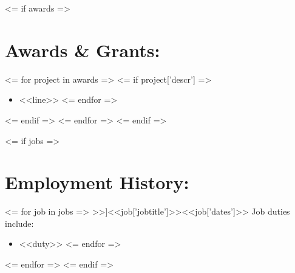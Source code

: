 \documentclass{resume}
\begin{document}
<= if awards =>
    \section{Awards \& Grants:}
    <= for project in awards =>
        <= if project['descr'] =>
            \small\begin{itemize}
            <= for line in project['descr'] =>
                \item <<line>>
            <= endfor =>
            \end{itemize}\normalsize
        <= endif =>
    <= endfor =>
<= endif =>

<= if jobs =>
    \section{Employment History:}
    <= for job in jobs =>
        \affiliation[<<job['employername']>>]{<<job['jobtitle']>>}{<<job['dates']>>}\normalsize
        Job duties include:
        \small\begin{itemize}
        <= for duty in job['duties'] =>
            \item <<duty>>
        <= endfor =>
        \end{itemize}\normalsize
        \medskip
    <= endfor =>
<= endif =>
\end{document}
